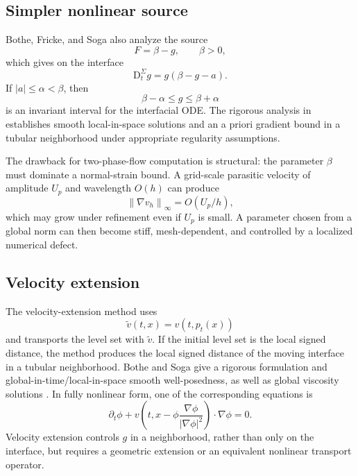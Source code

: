 \documentclass[11pt,a4paper]{article}
\theoremstyle{definition}
\theoremstyle{remark}
\newcommand{\norm}[1]{\left\lVert #1\right\rVert}
\newcommand{\abs}[1]{\left\lvert #1\right\rvert}
\newcommand{\material}{\mathrm{D}_t}
\begin{document}
\subsection{Simpler nonlinear source}

Bothe, Fricke, and Soga also analyze the source
\begin{equation}
  F=\beta-g,
  \qquad \beta>0,
  \label{eq:simple-source}
\end{equation}
which gives on the interface
\begin{equation}
  \material^{\Sigma}g=g(\beta-g-a).
  \label{eq:simple-g}
\end{equation}
If $\abs a\le\alpha<\beta$, then
\begin{equation}
  \beta-\alpha\le g\le\beta+\alpha
  \label{eq:simple-invariant}
\end{equation}
is an invariant interval for the interfacial ODE. The rigorous analysis in \cite{BotheFrickeSoga2024} establishes smooth local-in-space solutions and an a priori gradient bound in a tubular neighborhood under appropriate regularity assumptions.

The drawback for two-phase-flow computation is structural: the parameter $\beta$ must dominate a normal-strain bound. A grid-scale parasitic velocity of amplitude $U_p$ and wavelength $O(h)$ can produce
\begin{equation}
  \norm{\nabla v_h}_{\infty}=O(U_p/h),
  \label{eq:parasitic-scaling}
\end{equation}
which may grow under refinement even if $U_p$ is small. A parameter chosen from a global norm can then become stiff, mesh-dependent, and controlled by a localized numerical defect.

\subsection{Velocity extension}

The velocity-extension method uses
\begin{equation}
  \widetilde v(t,x)=v(t,p_t(x))
\end{equation}
and transports the level set with $\widetilde v$. If the initial level set is the local signed distance, the method produces the local signed distance of the moving interface in a tubular neighborhood. Bothe and Soga give a rigorous formulation and global-in-time/local-in-space smooth well-posedness, as well as global viscosity solutions \cite{BotheSoga2026}. In fully nonlinear form, one of the corresponding equations is
\begin{equation}
  \partial_t\phi+
  v\!\left(t,x-\phi\frac{\nabla\phi}{\abs{\nabla\phi}^2}\right)\cdot\nabla\phi=0.
  \label{eq:velocity-extension-nonlinear}
\end{equation}
Velocity extension controls $g$ in a neighborhood, rather than only on the interface, but requires a geometric extension or an equivalent nonlinear transport operator.
\end{document}
